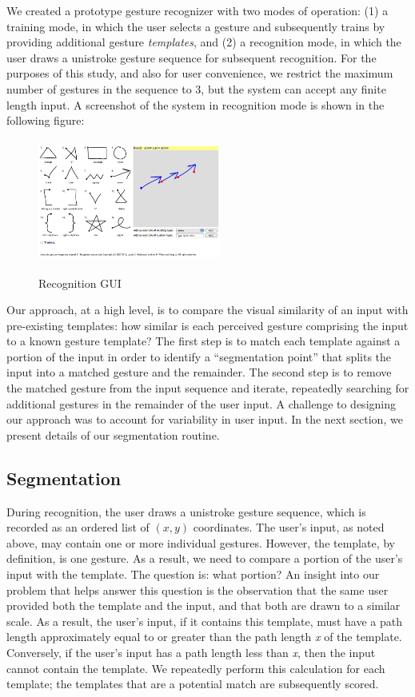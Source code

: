 \documentclass[twoside]{article}
\begin{document}
\begin{multicols}{2}
We created a prototype gesture recognizer with two modes of operation: (1) a
training mode, in which the user selects a gesture and subsequently trains by
providing additional gesture \emph{templates}, and (2) a recognition mode, in
which the user draws a unistroke gesture sequence for subsequent recognition.
For the purposes of this study, and also for user convenience, we restrict the
maximum number of gestures in the sequence to 3, but the system can accept any
finite length input. A screenshot of the system in recognition mode is shown in the following figure:

\begin{figure}[H]
	\centering
	\includegraphics[height=4cm, width=6cm]{Images/GUI.png}
	\label{fig1}
	\caption{Recognition GUI}
\end{figure}
  
Our approach, at a high level, is to compare the visual similarity of an input
with pre-existing templates: how similar is each perceived gesture comprising
the input to a known gesture template? The first step is to match each
template against a portion of the input in order to identify a ``segmentation
point'' that splits the input into a matched gesture and the remainder. The
second step is to remove the matched gesture from the input sequence and
iterate, repeatedly searching for additional gestures in the remainder of the
user input. A challenge to designing our approach was to account for variability
in user input. In the next section, we present details of our segmentation
routine.

\subsection*{Segmentation}

During recognition, the user draws a unistroke gesture sequence, which is
recorded as an ordered list of $(x,y)$ coordinates. The user's input, as noted
above, may contain one or more individual gestures. However, the template, by
definition, is one gesture. As a result, we need to compare a portion of the
user's input with the template.
The question is: what portion? An insight into our problem that helps answer
this question is the observation that the same user provided both the template
and the input, and that both are drawn to a similar scale. As a result, the
user's input, if it contains this template, must have a path length
approximately equal to or greater than the path length \emph{x} of the template.
Conversely, if the user's input has a path length less than \emph{x}, then the input cannot contain the template. We repeatedly perform
this calculation for each template; the templates that are a potential match
are subsequently scored.


\end{multicols}
\end{document}
